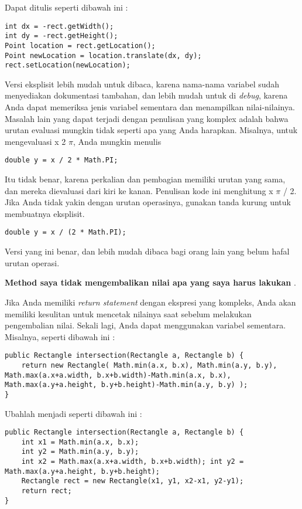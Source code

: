 \noindent Dapat ditulis seperti dibawah ini : 
\begin{lstlisting}
int dx = -rect.getWidth(); 
int dy = -rect.getHeight(); 
Point location = rect.getLocation(); 
Point newLocation = location.translate(dx, dy); rect.setLocation(newLocation);
\end{lstlisting}

\noindent Versi eksplisit lebih mudah untuk dibaca, karena nama-nama variabel sudah menyediakan dokumentasi tambahan, dan lebih mudah untuk di \textit{debug}, karena Anda dapat memeriksa jenis variabel sementara dan menampilkan nilai-nilainya.
Masalah lain yang dapat terjadi dengan penulisan yang komplex adalah bahwa urutan evaluasi mungkin tidak seperti apa yang Anda harapkan. Misalnya, untuk mengevaluasi x 2 $\pi$, Anda mungkin menulis

\begin{lstlisting}
double y = x / 2 * Math.PI;
\end{lstlisting}

\noindent Itu tidak benar, karena perkalian dan pembagian memiliki urutan yang sama, dan mereka dievaluasi dari kiri ke kanan. Penulisan kode ini menghitung x $\pi$ / 2.
Jika Anda tidak yakin dengan urutan operasinya, gunakan tanda kurung untuk membuatnya eksplisit. 

\begin{lstlisting}
double y = x / (2 * Math.PI);
\end{lstlisting}

\noindent Versi yang ini benar, dan lebih mudah dibaca bagi orang lain yang belum hafal urutan operasi.

\noindent \textbf{Method saya tidak mengembalikan nilai apa yang saya harus lakukan} .

\noindent Jika Anda memiliki \textit{return statement} dengan ekspresi yang kompleks, Anda akan memiliki kesulitan untuk mencetak nilainya saat sebelum melakukan pengembalian nilai. Sekali lagi, Anda dapat menggunakan variabel sementara. Misalnya, seperti dibawah ini :
\begin{lstlisting}
public Rectangle intersection(Rectangle a, Rectangle b) { 
    return new Rectangle( Math.min(a.x, b.x), Math.min(a.y, b.y), Math.max(a.x+a.width, b.x+b.width)-Math.min(a.x, b.x), Math.max(a.y+a.height, b.y+b.height)-Math.min(a.y, b.y) ); 
}
\end{lstlisting}

\noindent Ubahlah menjadi seperti dibawah ini :
\begin{lstlisting}
public Rectangle intersection(Rectangle a, Rectangle b) { 
    int x1 = Math.min(a.x, b.x); 
    int y2 = Math.min(a.y, b.y); 
    int x2 = Math.max(a.x+a.width, b.x+b.width); int y2 = Math.max(a.y+a.height, b.y+b.height); 
    Rectangle rect = new Rectangle(x1, y1, x2-x1, y2-y1); 
    return rect; 
}
\end{lstlisting}

